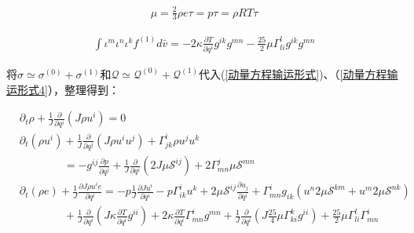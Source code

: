 \documentclass[LBMDerivation.tex]{subfiles}
\begin{document}
\begin{equation}
  \begin{aligned}
    \mu=\frac{2}{3} \rho e \tau=p \tau=\rho R T \tau
  \end{aligned}
\end{equation}


\begin{equation}
  \begin{gathered}
    \int \iota^m \iota^n  \iota^{k} f^{(1)}  d \bar{v} =  -2\kappa \frac{\partial T}{\partial q^i} g^{ik} g^{mn}- \frac{25}{2}\mu \Gamma_{li}^{l}g^{ik} g^{mn}
  \end{gathered}
\end{equation}


将$\sigma\simeq \sigma^{(0)}+\sigma^{(1)}$和$\mathcal{Q}\simeq \mathcal{Q}^{(0)}+\mathcal{Q}^{(1)}$代入(\ref{动量方程输运形式})、（\ref{动量方程输运形式4}），整理得到：





\begin{equation}
  \boxed{
    \begin{aligned}
       & \partial_{t} \rho+\frac{1}{J} \frac{\partial}{\partial q^{i}}\left(J \rho u^{i}\right)=0
      \\
       & \partial_{t}\left(\rho u^{i}\right)+\frac{1}{J} \frac{\partial}{\partial q^{j}}\left(J \rho u^{i} u^{j}\right)+\Gamma_{j k}^{i} \rho u^{j} u^{k}                                                                                                                                                                                 \\
       & \quad\quad\quad\quad =-g^{i j} \frac{\partial p}{\partial q^{j}}+ \frac{1}{J} \frac{\partial}{\partial q^i}(2J\mu \mathcal{S}^{ij}) + 2\Gamma_{mn}^j \mu \mathcal{S}^{mn}                                                                                                                                                        \\
       & \partial_{t}\left(\rho e\right) + \frac{1}{J}\frac{\partial J \rho u^i e}{\partial  q^{i}} = -  p\frac{1}{J}\frac{\partial J u^i}{\partial  q^{i}} -p\Gamma_{ik}^i u^k     + 2\mu \mathcal{S}^{ij} \frac{\partial u_j}{\partial q^i}  + \Gamma_{mn}^i g_{ik}(u^n 2\mu\mathcal{S}^{km} + u^m 2\mu\mathcal{S}^{nk} )               \\
       & \quad\quad\quad\quad  + \frac{1}{J} \frac{\partial}{\partial q^i} ( J \kappa \frac{\partial T}{\partial q^i} g^{ii}) +  2\kappa \frac{\partial T}{\partial q^i} \Gamma^i_{mn} g^{mn}     + \frac{1}{J} \frac{\partial}{\partial q^i} ( J\frac{25}{4}\mu \Gamma_{ki}^{k}g^{i i}  ) + \frac{25}{2}\mu \Gamma_{li}^{l}\Gamma^i_{mn} \\
    \end{aligned}
  }
\end{equation}
\end{document}
